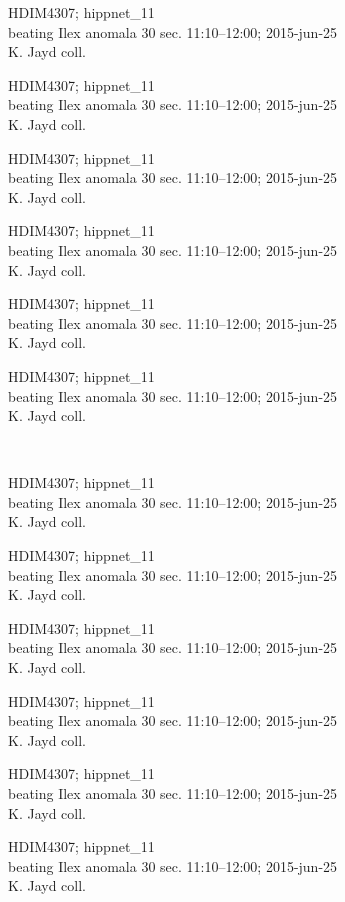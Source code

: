 \documentclass[2pt]{extarticle}
\begin{document}
\noindent
\parbox{0.16\textwidth}{\tiny \raggedright \rule[-0.3\baselineskip]{0pt}{10pt}HDIM4307; hippnet\_11\\ beating Ilex anomala 30 sec. 11:10--12:00; 2015-jun-25\\ K. Jayd coll.}
\parbox{0.16\textwidth}{\tiny \raggedright \rule[-0.3\baselineskip]{0pt}{10pt}HDIM4307; hippnet\_11\\ beating Ilex anomala 30 sec. 11:10--12:00; 2015-jun-25\\ K. Jayd coll.}
\parbox{0.16\textwidth}{\tiny \raggedright \rule[-0.3\baselineskip]{0pt}{10pt}HDIM4307; hippnet\_11\\ beating Ilex anomala 30 sec. 11:10--12:00; 2015-jun-25\\ K. Jayd coll.}
\parbox{0.16\textwidth}{\tiny \raggedright \rule[-0.3\baselineskip]{0pt}{10pt}HDIM4307; hippnet\_11\\ beating Ilex anomala 30 sec. 11:10--12:00; 2015-jun-25\\ K. Jayd coll.}
\parbox{0.16\textwidth}{\tiny \raggedright \rule[-0.3\baselineskip]{0pt}{10pt}HDIM4307; hippnet\_11\\ beating Ilex anomala 30 sec. 11:10--12:00; 2015-jun-25\\ K. Jayd coll.}
\parbox{0.16\textwidth}{\tiny \raggedright \rule[-0.3\baselineskip]{0pt}{10pt}HDIM4307; hippnet\_11\\ beating Ilex anomala 30 sec. 11:10--12:00; 2015-jun-25\\ K. Jayd coll.} \\ 
\vspace{0.001in} 

\noindent
\parbox{0.16\textwidth}{\tiny \raggedright \rule[-0.3\baselineskip]{0pt}{10pt}HDIM4307; hippnet\_11\\ beating Ilex anomala 30 sec. 11:10--12:00; 2015-jun-25\\ K. Jayd coll.}
\parbox{0.16\textwidth}{\tiny \raggedright \rule[-0.3\baselineskip]{0pt}{10pt}HDIM4307; hippnet\_11\\ beating Ilex anomala 30 sec. 11:10--12:00; 2015-jun-25\\ K. Jayd coll.}
\parbox{0.16\textwidth}{\tiny \raggedright \rule[-0.3\baselineskip]{0pt}{10pt}HDIM4307; hippnet\_11\\ beating Ilex anomala 30 sec. 11:10--12:00; 2015-jun-25\\ K. Jayd coll.}
\parbox{0.16\textwidth}{\tiny \raggedright \rule[-0.3\baselineskip]{0pt}{10pt}HDIM4307; hippnet\_11\\ beating Ilex anomala 30 sec. 11:10--12:00; 2015-jun-25\\ K. Jayd coll.}
\parbox{0.16\textwidth}{\tiny \raggedright \rule[-0.3\baselineskip]{0pt}{10pt}HDIM4307; hippnet\_11\\ beating Ilex anomala 30 sec. 11:10--12:00; 2015-jun-25\\ K. Jayd coll.}
\parbox{0.16\textwidth}{\tiny \raggedright \rule[-0.3\baselineskip]{0pt}{10pt}HDIM4307; hippnet\_11\\ beating Ilex anomala 30 sec. 11:10--12:00; 2015-jun-25\\ K. Jayd coll.} \\ 
\vspace{0.001in} 
\end{document}
